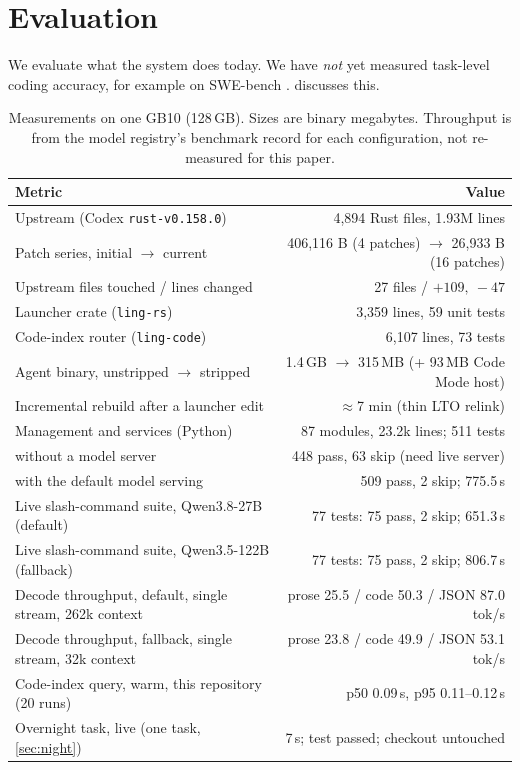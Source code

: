 \documentclass[11pt]{article}
\newcommand{\code}[1]{\texttt{#1}}
\begin{document}
\section{Evaluation}
\label{sec:eval}

We evaluate what the system does today. We have \emph{not} yet measured task-level coding accuracy,
for example on SWE-bench \cite{jimenez2024swebench}.  discusses this.

\begin{table}[t]
\centering
\small
\begin{tabular}{@{}l r@{}}
\toprule
Metric & Value \\
\midrule
Upstream (Codex \code{rust-v0.158.0}) & 4{,}894 Rust files, 1.93M lines \\
Patch series, initial $\rightarrow$ current & 406{,}116 B (4 patches) $\rightarrow$ 26{,}933 B (16 patches) \\
Upstream files touched / lines changed & 27 files / $+109,\ -47$ \\
Launcher crate (\code{ling-rs}) & 3{,}359 lines, 59 unit tests \\
Code-index router (\code{ling-code}) & 6{,}107 lines, 73 tests \\
Agent binary, unstripped $\rightarrow$ stripped & 1.4\,GB $\rightarrow$ 315\,MB (+ 93\,MB Code Mode host) \\
Incremental rebuild after a launcher edit & $\approx$7 min (thin LTO relink) \\
Management and services (Python) & 87 modules, 23.2k lines; 511 tests \\
\quad without a model server & 448 pass, 63 skip (need live server) \\
\quad with the default model serving & 509 pass, 2 skip; 775.5\,s \\
Live slash-command suite, Qwen3.8-27B (default) & 77 tests: 75 pass, 2 skip; 651.3\,s \\
Live slash-command suite, Qwen3.5-122B (fallback) & 77 tests: 75 pass, 2 skip; 806.7\,s \\
Decode throughput, default, single stream, 262k context & prose 25.5 / code 50.3 / JSON 87.0 tok/s \\
Decode throughput, fallback, single stream, 32k context & prose 23.8 / code 49.9 / JSON 53.1 tok/s \\
Code-index query, warm, this repository (20 runs) & p50 0.09\,s, p95 0.11--0.12\,s \\
Overnight task, live (one task, \cref{sec:night}) & 7\,s; test passed; checkout untouched \\
\bottomrule
\end{tabular}
\caption{Measurements on one GB10 (128\,GB). Sizes are binary megabytes. Throughput is from the
model registry's benchmark record for each configuration, not re-measured for this paper.}
\label{tab:eval}
\end{table}
\end{document}
